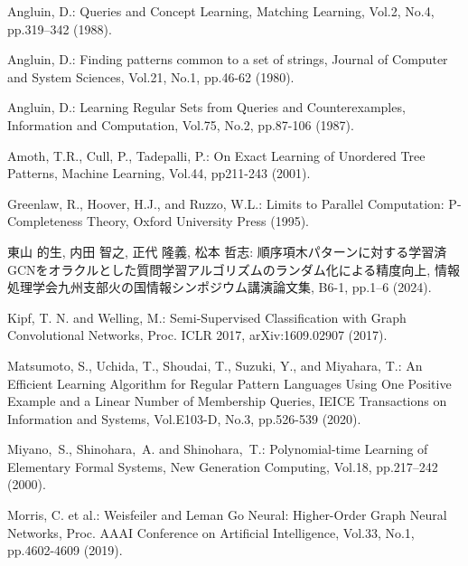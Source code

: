 \begin{thebibliography}{99}

  Angluin, D.:
  Queries and Concept Learning,
  Matching Learning, Vol.2, No.4, pp.319--342 (1988).

  Angluin, D.:
  Finding patterns common to a set of strings,
  Journal of Computer and System Sciences, Vol.21, No.1, pp.46-62 (1980).

  Angluin, D.:
  Learning Regular Sets from Queries and Counterexamples,
  Information and Computation, Vol.75, No.2, pp.87-106 (1987).

  Amoth, T.R., Cull, P., Tadepalli, P.:
  On Exact Learning of Unordered Tree Patterns,
  Machine Learning, Vol.44, pp211-243 (2001).

  Greenlaw, R., Hoover, H.J., and Ruzzo, W.L.:
  Limits to Parallel Computation: P-Completeness Theory, 
  Oxford University Press (1995).

  東山 的生, 内田 智之, 正代 隆義, 松本 哲志:
  順序項木パターンに対する学習済GCNをオラクルとした質問学習アルゴリズムのランダム化による精度向上,
  情報処理学会九州支部火の国情報シンポジウム講演論文集, B6-1, pp.1--6 (2024).

  Kipf, T. N. and Welling, M.: 
  Semi-Supervised Classification with Graph Convolutional Networks, 
  Proc. ICLR 2017, arXiv:1609.02907 (2017).

  Matsumoto, S., Uchida, T., Shoudai, T., Suzuki, Y., and Miyahara, T.:
  An Efficient Learning Algorithm for Regular Pattern Languages Using One Positive Example and a Linear Number of Membership Queries,
  IEICE Transactions on Information and Systems, Vol.E103-D, No.3, pp.526-539 (2020).


  Miyano,~S., Shinohara,~A. and Shinohara,~T.:
  Polynomial-time Learning of Elementary Formal Systems,
  New Generation Computing, Vol.18, pp.217--242 (2000).

  Morris, C. et al.: 
  Weisfeiler and Leman Go Neural: Higher-Order Graph Neural Networks, 
  Proc. AAAI Conference on Artificial Intelligence, 
  Vol.33, No.1, pp.4602-4609 (2019). 


\end{thebibliography}
